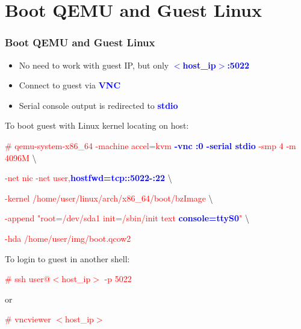 \documentclass[aspectratio=169]{beamer}
\begin{document}
\section{Boot QEMU and Guest Linux}
\begin{frame}
\frametitle{Boot QEMU and Guest Linux}
\begin{itemize}
\item No need to work with guest IP, but only \textbf{\textcolor{blue}{$<$host\_ip$>$:5022}}
\item Connect to guest via \textbf{\textcolor{blue}{VNC}}
\item Serial console output is redirected to \textbf{\textcolor{blue}{stdio}}
\end{itemize}
\begin{block}{}

To boot guest with Linux kernel locating on host:

\textcolor{red}{\# qemu-system-x86\_64 -machine accel=kvm \textbf{\textcolor{blue}{-vnc :0 -serial stdio}} -smp 4 -m 4096M} \textbackslash

\textcolor{red}{-net nic -net user,\textbf{\textcolor{blue}{hostfwd=tcp::5022-:22}}} \textbackslash

\textcolor{red}{-kernel /home/user/linux/arch/x86\_64/boot/bzImage} \textbackslash
	
\textcolor{red}{-append "root=/dev/sda1 init=/sbin/init text \textbf{\textcolor{blue}{console=ttyS0}}"} \textbackslash

\textcolor{red}{-hda /home/user/img/boot.qcow2} \newline

To login to guest in another shell:

\textcolor{red}{\# ssh user@$<$host\_ip$>$ -p 5022}

or

\textcolor{red}{\# vncviewer $<$host\_ip$>$}

\end{block}
\end{frame}

\end{document}
